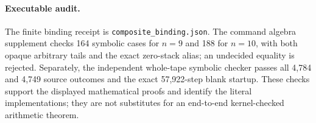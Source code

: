 \paragraph{Executable audit.}
The finite binding receipt is \texttt{composite\_binding.json}.
The command algebra supplement checks 164 symbolic cases for $n=9$ and
188 for $n=10$, with both opaque arbitrary tails and the exact zero-stack
alias; an undecided equality is rejected. Separately, the independent
whole-tape symbolic checker passes all 4,784 and 4,749 source outcomes and
the exact 57,922-step blank startup. These checks support the displayed
mathematical proofs and identify the literal implementations; they are
not substitutes for an end-to-end kernel-checked arithmetic theorem.
